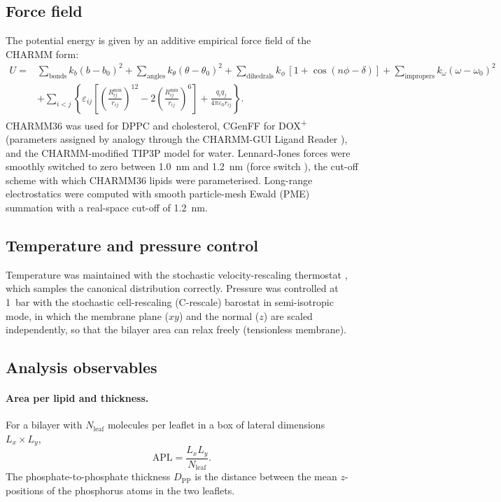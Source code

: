 \documentclass[11pt,a4paper]{article}
\newcommand{\dox}{DOX\textsuperscript{+}}
\begin{document}
\subsection{Force field}
The potential energy is given by an additive empirical force field of the CHARMM form:
\begin{equation}
\begin{aligned}
U ={}& \sum_{\text{bonds}} k_b (b-b_0)^2 + \sum_{\text{angles}} k_\theta(\theta-\theta_0)^2
      + \sum_{\text{dihedrals}} k_\phi\,[1+\cos(n\phi-\delta)]
      + \sum_{\text{impropers}} k_\omega(\omega-\omega_0)^2 \\
     &+ \sum_{i<j}\left\{ \varepsilon_{ij}\left[\left(\frac{R^{\min}_{ij}}{r_{ij}}\right)^{12}
      - 2\left(\frac{R^{\min}_{ij}}{r_{ij}}\right)^{6}\right]
      + \frac{q_i q_j}{4\pi\varepsilon_0 r_{ij}} \right\}.
\end{aligned}
\label{eq:ff}
\end{equation}
CHARMM36 \cite{klauda2010} was used for DPPC and cholesterol, CGenFF \cite{vanommeslaeghe2010} for
\dox{} (parameters assigned by analogy through the CHARMM-GUI Ligand Reader \cite{kim2017}), and the
CHARMM-modified TIP3P model \cite{jorgensen1983} for water. Lennard-Jones forces were smoothly switched
to zero between \SI{1.0}{nm} and \SI{1.2}{nm} (force switch \cite{steinbach1994}), the cut-off scheme
with which CHARMM36 lipids were parameterised. Long-range electrostatics were computed with smooth
particle-mesh Ewald (PME) summation \cite{essmann1995} with a real-space cut-off of \SI{1.2}{nm}.

\subsection{Temperature and pressure control}
Temperature was maintained with the stochastic velocity-rescaling thermostat \cite{bussi2007}, which
samples the canonical distribution correctly. Pressure was controlled at \SI{1}{bar} with the stochastic
cell-rescaling (C-rescale) barostat \cite{bernetti2020} in semi-isotropic mode, in which the membrane
plane ($xy$) and the normal ($z$) are scaled independently, so that the bilayer area can relax freely
(tensionless membrane).

\subsection{Analysis observables}
\paragraph{Area per lipid and thickness.}
For a bilayer with $N_\mathrm{leaf}$ molecules per leaflet in a box of lateral dimensions $L_x\times L_y$,
\begin{equation}
  \mathrm{APL} = \frac{L_x L_y}{N_\mathrm{leaf}} .
\end{equation}
The phosphate-to-phosphate thickness $D_\mathrm{PP}$ is the distance between the mean $z$-positions of
the phosphorus atoms in the two leaflets.
\end{document}
